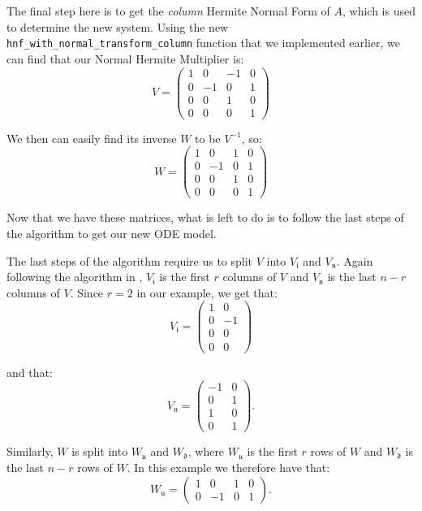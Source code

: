 \documentclass[oneside, a4paper, onecolumn, 11pt]{article}
\begin{document}
The final step here is to get the \textit{column} Hermite Normal Form of \(A\), which is used to determine the new system. Using the new \texttt{hnf\_with\_normal\_transform\_column} function that we implemented earlier, we can find that our Normal Hermite Multiplier is:
\[
    V = \begin{pmatrix}
        1 & 0  & -1 & 0 \\
        0 & -1 & 0  & 1 \\
        0 & 0  & 1  & 0 \\
        0 & 0  & 0  & 1
    \end{pmatrix}
\]

We then can easily find its inverse \(W\) to be \(V^{-1}\), so:
\[
    W = \begin{pmatrix}
        1 & 0  & 1 & 0 \\
        0 & -1 & 0 & 1 \\
        0 & 0  & 1 & 0 \\
        0 & 0  & 0 & 1
    \end{pmatrix}
\]

Now that we have these matrices, what is left to do is to follow the last steps of the algorithm to get our new ODE model.

The last steps of the algorithm require us to split \(V\) into \(V_{\mathfrak{i}}\) and \(V_{\mathfrak{n}}\). Again following the algorithm in \cite{Hubert2013}, \(V_{\mathfrak{i}}\) is the first \(r\) columns of \(V\) and \(V_{\mathfrak{n}}\) is the last \(n - r\) columns of \(V\). Since \(r = 2\) in our example, we get that:
\[
    V_{\mathfrak{i}} = \begin{pmatrix}
        1 & 0  \\
        0 & -1 \\
        0 & 0  \\
        0 & 0
    \end{pmatrix}
\]

and that:
\[
    V_{\mathfrak{n}} = \begin{pmatrix}
        -1 & 0 \\
        0  & 1 \\
        1  & 0 \\
        0  & 1
    \end{pmatrix}.
\]

Similarly, \(W\) is split into \(W_{\mathfrak{u}}\) and \(W_{\mathfrak{d}}\), where \(W_{\mathfrak{u}}\) is the first \(r\) rows of \(W\) and \(W_{\mathfrak{d}}\) is the last \(n - r\) rows of \(W\). In this example we therefore have that:
\[
    W_{\mathfrak{u}} = \begin{pmatrix}
        1 & 0  & 1 & 0 \\
        0 & -1 & 0 & 1
    \end{pmatrix}.
\]
\end{document}

